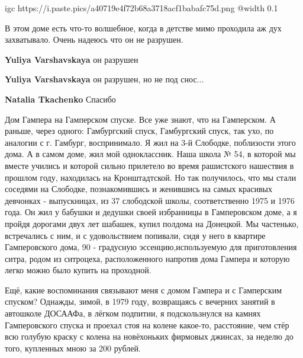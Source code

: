  
 
 
 
 

\qqSecCmt


\ifcmt
  igc https://i.paste.pics/a40719e4f72b68a3718acf1babafc75d.png
	@width 0.1
\fi


В этом доме есть что-то волшебное, когда в детстве мимо проходила аж дух
захватывало. Очень надеюсь что он не разрушен.

\begin{itemize} %
\textbf{Yuliya Varshavskaya} он разрушен

\textbf{Yuliya Varshavskaya} он разрушен, но не под снос...

\textbf{Natalia Tkachenko} Спасибо 🙏
\end{itemize} %


Дом Гампера на Гамперском спуске. Все уже знают, что на Гамперском. А раньше,
через одного: Гамбургский спуск, Гамбургский спуск, так ухо, по аналогии с г.
Гамбург, воспринимало. Я жил на 3-й Слободке, поблизости этого дома. А в самом
доме, жил мой одноклассник. Наша школа № 54, в которой мы вместе учились и
которой сильно прилетело во время рашистского нашествия в прошлом году,
находилась на Кронштадтской. Но так получилось, что мы стали соседями на
Слободке, познакомившись и женившись на самых красивых девчонках - выпускницах,
из 37 слободской школы, соответственно 1975 и 1976 года. Он жил у бабушки и
дедушки своей избранницы в Гамперовском доме, а я пройдя дорогами двух лет
шабашек, купил полдома на Донецкой. Мы частенько, встречались с ним, и с
удовольствием попивали, сидя у него в квартире Гамперовского дома, 90 -
градусную эссенцию,используемую для приготовления ситра, родом из ситроцеха,
расположенного напротив дома Гампера и которую легко можно было купить на
проходной.

Ещё, какие воспоминания связывают меня с домом Гампера и с Гамперским спуском?
Однажды, зимой, в 1979 году, возвращаясь с вечерних занятий в автошколе
ДОСААФа, в лёгком подпитии, я подскользнулся на камнях Гамперовского спуска и
проехал стоя на колене какое-то, расстояние, чем стёр всю голубую краску с
колена на новёхоньких фирмовых джинсах, за неделю до того, купленных мною за
200 рублей.

